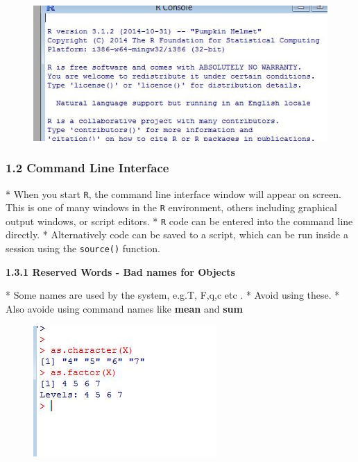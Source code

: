 
 
 
 
 \begin{figure}
 \centering
 \includegraphics[width=0.7\linewidth]{images/Rversion}        
 \end{figure}
   
 
 
 \frametitle{1.2 Command Line Interface}
 
*  When you start \texttt{R}, the command line interface window will appear on screen. This is one
 of many windows in the \texttt{R} environment, others including graphical output windows, or script
 editors. 
*  \texttt{R} code can be entered into the command line directly. 
*  Alternatively code can be saved
 to a script, which can be run inside a session using the \texttt{source()} function.

 

 
 \textbf{1.3.1 Reserved Words - Bad names for Objects}
 
*  Some names are used by the system, e.g.T, F,q,c etc . 
*  Avoid using these.
*  Also avoide using command names like \textbf{mean} and \textbf{sum}

 
 
 \begin{figure}
 \centering
 \includegraphics[width=0.7\linewidth]{images/typeconversion} 
 \end{figure}
    
